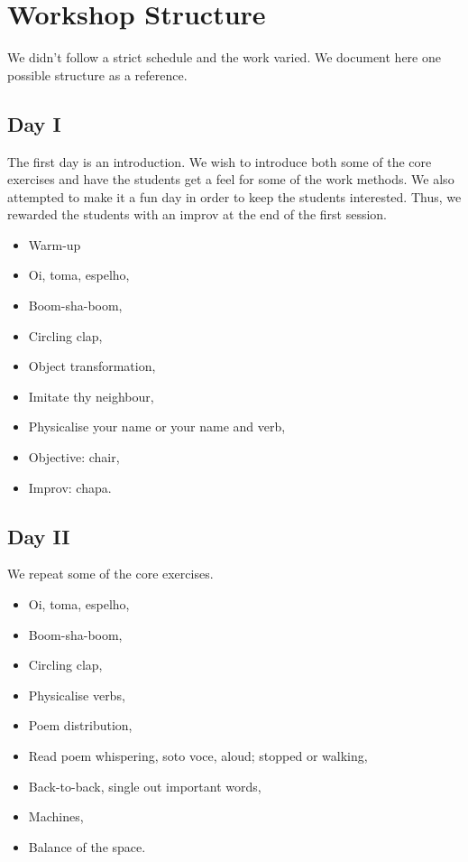 \documentclass[article,twoside]{memoir}
\begin{document}
\chapter{Workshop Structure}

We didn't follow a strict schedule and the work varied. We document here one
possible structure as a reference.

\section{Day I}
The first day is an introduction. We wish to introduce both some of the core
exercises and have the students get a feel for some of the work methods. We
also attempted to make it a fun day in order to keep the students interested.
Thus, we rewarded the students with an improv at the end of the first session.

\begin{itemize}
\item Warm-up
\item Oi, toma, espelho,
\item Boom-sha-boom,
\item Circling clap,
\item Object transformation,
\item Imitate thy neighbour,
\item Physicalise your name or your name and verb,
\item Objective: chair,
\item Improv: chapa.
\end{itemize}
\section{Day II}

We repeat some of the core exercises.

\begin{itemize}
\item Oi, toma, espelho,
\item Boom-sha-boom,
\item Circling clap,
\item Physicalise verbs,
\item Poem distribution,
\item Read poem whispering, soto voce, aloud; stopped or walking,
\item Back-to-back, single out important words,
\item Machines,
\item Balance of the space.
\end{itemize}
\end{document}
